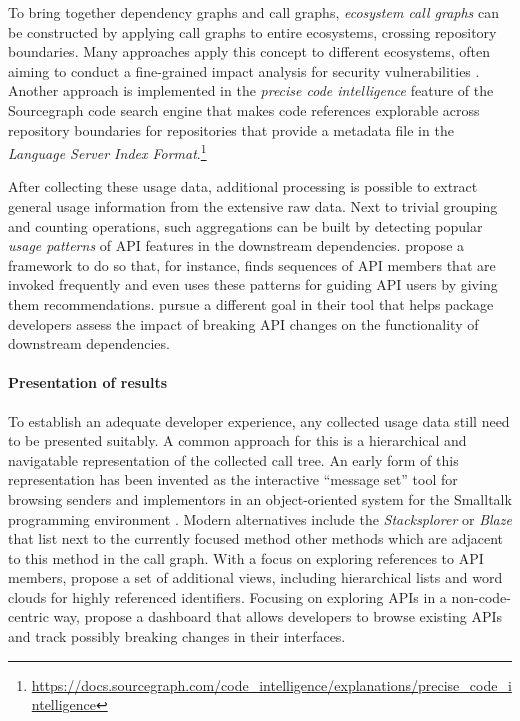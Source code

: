 To bring together dependency graphs and call graphs, \emph{ecosystem call graphs} can be constructed by applying call graphs to entire ecosystems, crossing repository boundaries.
Many approaches apply this concept to different ecosystems, often aiming to conduct a fine-grained impact analysis for security vulnerabilities \citep{boldi2020fine,hejderup2018software,hejderup2021praezi,keshani2021scalable,nielsen2021modular,wang2020empirical}.
Another approach is implemented in the \emph{precise code intelligence} feature of the Sourcegraph code search engine that makes code references explorable across repository boundaries for repositories that provide a metadata file in the \emph{Language Server Index Format}.\footnote{\url{https://docs.sourcegraph.com/code_intelligence/explanations/precise_code_intelligence}}

After collecting these usage data, additional processing is possible to extract general usage information from the extensive raw data.
Next to trivial grouping and counting operations, such aggregations can be built by detecting popular \emph{usage patterns} of API features in the downstream dependencies.
\citet{zhong2009mapo} propose a framework to do so that, for instance, finds sequences of API members that are invoked frequently and even uses these patterns for guiding API users by giving them recommendations.
\citet{hanam2019aiding} pursue a different goal in their tool that helps package developers assess the impact of breaking API changes on the functionality of downstream dependencies.

\paragraph{Presentation of results}
\label{sec:related_work/presentation}

To establish an adequate developer experience, any collected usage data still need to be presented suitably.
A common approach for this is a hierarchical and navigatable representation of the collected call tree.
An early form of this representation has been invented as the interactive ``message set'' tool for browsing senders and implementors in an object-oriented system for the Smalltalk programming environment \citep{goldberg1984smalltalk}.
Modern alternatives include the \emph{Stacksplorer} \citep{karrer2011stacksplorer} or \emph{Blaze} \citep{kramer2012blaze} that list next to the currently focused method other methods which are adjacent to this method in the call graph.
With a focus on exploring references to API members, \citet{de2013multi} propose a set of additional views, including hierarchical lists and word clouds for highly referenced identifiers.
Focusing on exploring APIs in a non-code-centric way, \citet{hora2015apiwave} propose a dashboard that allows developers to browse existing APIs and track possibly breaking changes in their interfaces.
